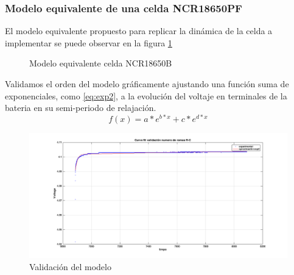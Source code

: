 \documentclass[10pt]{beamer}
\theoremstyle{remark}
\theoremstyle{definition}
\begin{document}
\begin{frame}[allowframebreaks]
	\frametitle{Modelo equivalente de una celda NCR18650PF}
  	El modelo equivalente propuesto para replicar la dinámica de la celda a
  	implementar se puede observar en la figura \ref{fig:ModeloBat}
  	\begin{figure}
		\begin{center}
	  \caption{Modelo equivalente celda NCR18650B}
	  \label{fig:ModeloBat}
	  \end{center}
	\end{figure}
	\begin{minipage}{0.45\linewidth}
  		Validamos el orden del modelo gráficamente ajustando una función 
  		suma de exponenciales, como \ref{eq:exp2}, a la evolución del 
  		voltaje en terminales de la bateria en su semi-periodo de relajación.
  		\begin{equation}
			f(x) = a*e^{b*x} + c*e^{d*x}
			\label{eq:exp2}
  		\end{equation}
	\end{minipage}\hfill
	\begin{minipage}{0.45\linewidth}
  		\begin{figure}[h!]
			\centering
			\includegraphics[width=1.3\linewidth]{images/exp_ord_2_val.png}
			\caption{Validación del modelo}
			\label{fig:val_exp2}
  		\end{figure}
	\end{minipage}
\end{frame}
\end{document}
